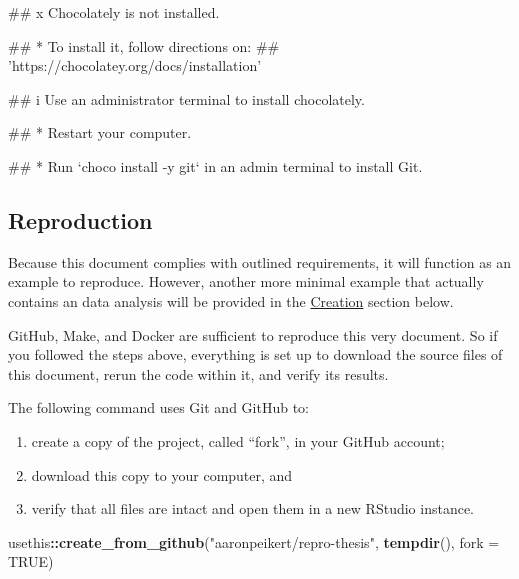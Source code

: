 \documentclass[12pt,a4paper,twoside]{article}
\newenvironment{Shaded}{\begin{snugshade}}{\end{snugshade}}
\newcommand{\DataTypeTok}[1]{\textcolor[rgb]{0.13,0.29,0.53}{#1}}
\newcommand{\KeywordTok}[1]{\textcolor[rgb]{0.13,0.29,0.53}{\textbf{#1}}}
\newcommand{\NormalTok}[1]{#1}
\newcommand{\OperatorTok}[1]{\textcolor[rgb]{0.81,0.36,0.00}{\textbf{#1}}}
\newcommand{\OtherTok}[1]{\textcolor[rgb]{0.56,0.35,0.01}{#1}}
\newcommand{\StringTok}[1]{\textcolor[rgb]{0.31,0.60,0.02}{#1}}
\providecommand{\tightlist}{%
  \setlength{\itemsep}{0pt}\setlength{\parskip}{0pt}}
\let\oldverbatim\verbatim
\let\endoldverbatim\endverbatim
\renewenvironment{verbatim}{\footnotesize\oldverbatim}{\endoldverbatim}
\begin{document}
\begin{verbatim}
## x Chocolately is not installed.
\end{verbatim}

\begin{verbatim}
## * To install it, follow directions on: 
##   'https://chocolatey.org/docs/installation'
\end{verbatim}

\begin{verbatim}
## i Use an administrator terminal to install chocolately.
\end{verbatim}

\begin{verbatim}
## * Restart your computer.
\end{verbatim}

\begin{verbatim}
## * Run `choco install -y git` in an admin terminal to install Git.
\end{verbatim}

\hypertarget{reproduction}{%
\subsection{Reproduction}\label{reproduction}}

Because this document complies with outlined requirements, it will function as an example to reproduce.
However, another more minimal example that actually contains an data analysis will be provided in the \protect\hyperlink{creation}{Creation} section below.

GitHub, Make, and Docker are sufficient to reproduce this very document.
So if you followed the steps above, everything is set up to download the source files of this document, rerun the code within it, and verify its results.

The following command uses Git and GitHub to:

\begin{enumerate}
\def\labelenumi{\arabic{enumi}.}
\tightlist
\item
  create a copy of the project, called ``fork'', in your GitHub account;
\item
  download this copy to your computer, and
\item
  verify that all files are intact and open them in a new RStudio instance.
\end{enumerate}

\begin{Shaded}
\begin{Highlighting}[]
\NormalTok{usethis}\OperatorTok{::}\KeywordTok{create_from_github}\NormalTok{(}\StringTok{"aaronpeikert/repro-thesis"}\NormalTok{,}
                            \KeywordTok{tempdir}\NormalTok{(),}
                            \DataTypeTok{fork =} \OtherTok{TRUE}\NormalTok{)}
\end{Highlighting}
\end{Shaded}
\end{document}
